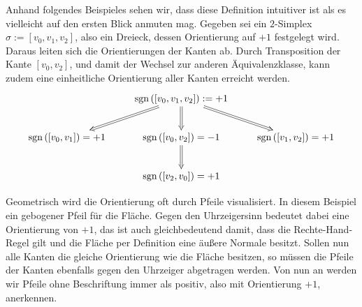     \begin{beispiel}
      \label{bspOrientierung}
      Anhand folgendes Beispieles sehen wir, dass diese Definition intuitiver ist als es vielleicht auf den ersten Blick anmuten mag.
      Gegeben sei ein \( 2 \)-Simplex \mbox{\( \sigma:=\left[ v_{0}, v_{1}, v_{2} \right] \)}, also ein Dreieck, dessen Orientierung auf \( +1 \) festgelegt wird.
      Daraus leiten sich die Orientierungen der Kanten ab. 
      Durch Transposition der Kante \( \left[ v_{0}, v_{2} \right] \), und damit der Wechsel zur anderen Äquivalenzklasse, 
      kann zudem eine einheitliche Orientierung aller Kanten erreicht werden.
      \begin{align}
        \begin{xy}
          \xymatrix{
            & \sgn\left( \left[ v_{0}, v_{1}, v_{2} \right] \right):=+1 \ar@{=>}[ld] \ar@{=>}[d] \ar@{=>}[rd]& \\
            \sgn\left( \left[ v_{0}, v_{1} \right] \right)=+1 &
            \sgn\left( \left[ v_{0}, v_{2} \right] \right)=-1 \ar@{=>}[d] &
            \sgn\left( \left[ v_{1}, v_{2} \right] \right)=+1 \\
            & \sgn\left( \left[ v_{2}, v_{0} \right] \right)=+1 &
          }
        \end{xy}
      \end{align}
      \begin{minipage}{0.65\textwidth}
        Geometrisch wird die Orientierung oft durch Pfeile visualisiert.
        In diesem Beispiel ein gebogener Pfeil für die Fläche.
        Gegen den Uhrzeigersinn bedeutet dabei eine Orientierung von \( +1 \), das ist auch gleichbedeutend damit, 
        dass die Rechte-Hand-Regel 
        gilt und die Fläche per Definition eine äußere Normale besitzt.
        Sollen nun alle Kanten die gleiche Orientierung wie die Fläche besitzen, so müssen die Pfeile der Kanten ebenfalls gegen den Uhrzeiger abgetragen werden.
        Von nun an werden wir Pfeile ohne Beschriftung immer als positiv, also mit Orientierung \( +1 \), anerkennen.
      \end{minipage}
      \hfill
      \begin{minipage}{0.3\textwidth}  
\end{minipage}
\end{beispiel}
